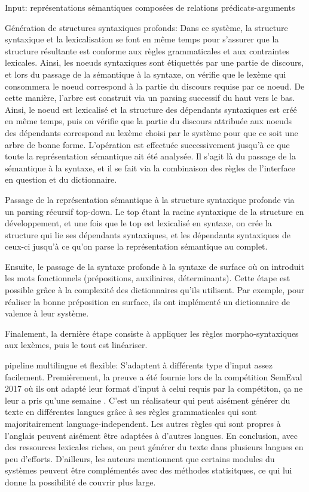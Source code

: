 Input: représentations sémantiques composées de relations prédicats-arguments 

Génération de structures syntaxiques profonds: Dans ce système, la structure syntaxique et la lexicalisation se font en même temps pour s'assurer que la structure résultante est conforme aux règles grammaticales et aux contraintes lexicales. Ainsi, les noeuds syntaxiques sont étiquettés par une partie de discours, et lors du passage de la sémantique à la syntaxe, on vérifie que le lexème qui consommera le noeud correspond à la partie du discours requise par ce noeud. De cette manière, l'arbre est construit via un parsing successif du haut vers le bas. Ainsi, le noeud est lexicalisé et la structure des dépendants syntaxiques est créé en même temps, puis on vérifie que la partie du discours attribuée aux noeuds des dépendants correspond au lexème choisi par le système pour que ce soit une arbre de bonne forme. L'opération est effectuée successivement jusqu'à ce que toute la représentation sémantique ait été analysée. Il s'agit là du passage de la sémantique à la syntaxe, et il se fait via la combinaison des règles de l'interface en question et du dictionnaire.

Passage de la représentation sémantique à la structure syntaxique profonde via un parsing récursif top-down. Le top étant la racine syntaxique de la structure en développement, et une fois que le top est lexicalisé en syntaxe, on crée la structure qui lie ses dépendants syntaxiques, et les dépendants syntaxiques de ceux-ci jusqu'à ce qu'on parse la représentation sémantique au complet. 

Ensuite, le passage de la syntaxe profonde à la syntaxe de surface où on introduit les mots fonctionnels (prépositions, auxiliaires, déterminants). Cette étape est possible grâce à la complexité des dictionnaires qu'ils utilisent. Par exemple, pour réaliser la bonne préposition en surface, ils ont implémenté un dictionnaire de valence à leur système.

Finalement, la dernière étape consiste à appliquer les règles morpho-syntaxiques aux lexèmes, puis le tout est linéariser.

pipeline multilingue et flexible: S'adaptent à différents type d'input assez facilement. Premièrement, la preuve a été fournie lors de la compétition SemEval 2017 où ils ont adapté leur format d'input à celui requis par la compétiton, ça ne leur a pris qu'une semaine \citep{DBLP:conf/semeval/MilleCBW17}. C'est un réalisateur qui peut aisément générer du texte en différentes langues grâce à ses règles grammaticales qui sont majoritairement language-independent. Les autres règles qui sont propres à l'anglais peuvent aisément être adaptées à d'autres langues. En conclusion, avec des ressources lexicales riches, on peut générer du texte dans plusieurs langues en peu d'efforts. D'ailleurs, les auteurs mentionnent que certains modules du systèmes peuvent être complémentés avec des méthodes statisitques, ce qui lui donne la possibilité de couvrir plus large.

